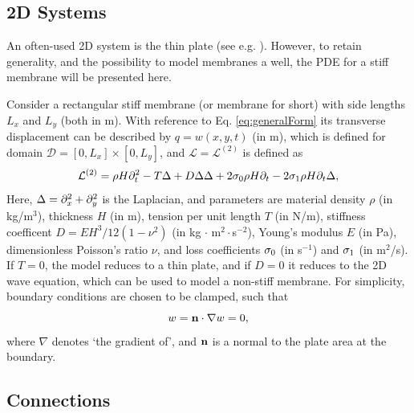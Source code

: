 \documentclass{article}
\begin{document}
\subsection{2D Systems}
An often-used 2D system is the thin plate (see e.g. \cite{Webb2015, Willemsen2020}). However, to retain generality, and the possibility to model membranes a well, the PDE for a stiff membrane will be presented here.

Consider a rectangular stiff membrane (or membrane for short) with side lengths $L_x$ and $L_y$ (both in m). With reference to Eq. \eqref{eq:generalForm} its transverse displacement can be described by $q = w(x, y, t)$ (in m), which is defined for domain
$\mathcal{D} = [0, L_x] \times [0, L_y]$, and $\mathcal{L}=\mathcal{L}^{(2)}$ is defined as \cite{Fletcher1998}
\begin{equation}\label{eq:stiffMembrane}
        \mathcal{L}^{(2)} = \rho H\partial_t^2 - T \Delta + D \Delta\Delta+ 2\sigma_{0}\rho H\partial_t - 2 \sigma_{1}\rho H\partial_t\Delta,
\end{equation}
Here, $\Delta = \partial_x^2 + \partial_y^2$ is the Laplacian, and parameters are material density $\rho$ (in kg/m$^3$), thickness $H$ (in m), tension per unit length $T$ (in N/m), stiffness coefficent $D = E H^3 / 12 (1-\nu^2)$ (in kg $\cdot$ m$^2\cdot$s$^{-2}$), Young's modulus $E$ (in Pa), dimensionless Poisson's ratio $\nu$, and loss coefficients $\sigma_{0}$ (in s$^{-1}$) and $\sigma_{1}$ (in m$^2$/s).
If $T = 0$, the model reduces to a thin plate, and if $D=0$ it reduces to the 2D wave equation, which can be used to model a non-stiff membrane.
%
For simplicity, boundary conditions are chosen to be clamped, such that
\begin{equation}
        w = {\bf n} \cdot \nabla w = 0,
\end{equation}
where $\nabla$ denotes `the gradient of', and ${\bf n}$ is a normal to the plate area at the boundary.

\subsection{Connections}\label{sec:contConnections}
\end{document}
